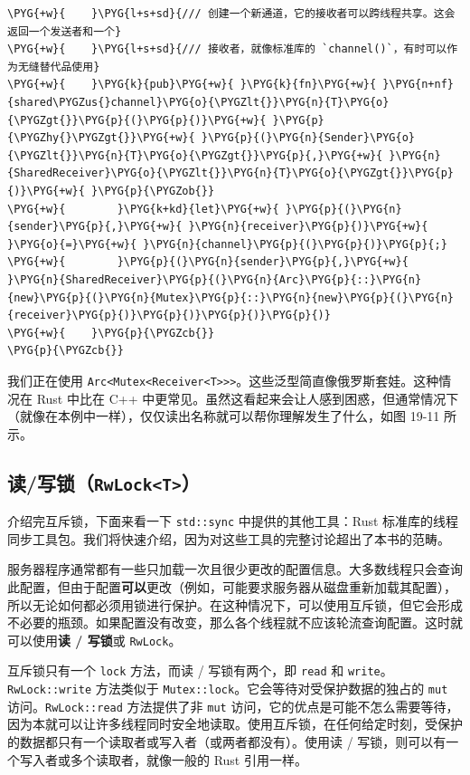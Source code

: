\begin{Verbatim}[commandchars=\\\{\},breaklines=true,breakanywhere=true,fontsize=\codefont,xleftmargin=17bp]
\PYG{+w}{    }\PYG{l+s+sd}{/// 创建一个新通道，它的接收者可以跨线程共享。这会返回一个发送者和一个}
\PYG{+w}{    }\PYG{l+s+sd}{/// 接收者，就像标准库的 `channel()`，有时可以作为无缝替代品使用}
\PYG{+w}{    }\PYG{k}{pub}\PYG{+w}{ }\PYG{k}{fn}\PYG{+w}{ }\PYG{n+nf}{shared\PYGZus{}channel}\PYG{o}{\PYGZlt{}}\PYG{n}{T}\PYG{o}{\PYGZgt{}}\PYG{p}{(}\PYG{p}{)}\PYG{+w}{ }\PYG{p}{\PYGZhy{}\PYGZgt{}}\PYG{+w}{ }\PYG{p}{(}\PYG{n}{Sender}\PYG{o}{\PYGZlt{}}\PYG{n}{T}\PYG{o}{\PYGZgt{}}\PYG{p}{,}\PYG{+w}{ }\PYG{n}{SharedReceiver}\PYG{o}{\PYGZlt{}}\PYG{n}{T}\PYG{o}{\PYGZgt{}}\PYG{p}{)}\PYG{+w}{ }\PYG{p}{\PYGZob{}}
\PYG{+w}{        }\PYG{k+kd}{let}\PYG{+w}{ }\PYG{p}{(}\PYG{n}{sender}\PYG{p}{,}\PYG{+w}{ }\PYG{n}{receiver}\PYG{p}{)}\PYG{+w}{ }\PYG{o}{=}\PYG{+w}{ }\PYG{n}{channel}\PYG{p}{(}\PYG{p}{)}\PYG{p}{;}
\PYG{+w}{        }\PYG{p}{(}\PYG{n}{sender}\PYG{p}{,}\PYG{+w}{ }\PYG{n}{SharedReceiver}\PYG{p}{(}\PYG{n}{Arc}\PYG{p}{::}\PYG{n}{new}\PYG{p}{(}\PYG{n}{Mutex}\PYG{p}{::}\PYG{n}{new}\PYG{p}{(}\PYG{n}{receiver}\PYG{p}{)}\PYG{p}{)}\PYG{p}{)}\PYG{p}{)}
\PYG{+w}{    }\PYG{p}{\PYGZcb{}}
\PYG{p}{\PYGZcb{}}
\end{Verbatim}

我们正在使用 \texttt{Arc<Mutex<Receiver<T>>>}。这些泛型简直像俄罗斯套娃。这种情况在 Rust 中比在 C++ 中更常见。虽然这看起来会让人感到困惑，但通常情况下（就像在本例中一样），仅仅读出名称就可以帮你理解发生了什么，如图 19-11 所示。


\subsection{读/写锁（\texttt{RwLock<T>}）}

介绍完互斥锁，下面来看一下 \texttt{std::sync} 中提供的其他工具：Rust 标准库的线程同步工具包。我们将快速介绍，因为对这些工具的完整讨论超出了本书的范畴。

服务器程序通常都有一些只加载一次且很少更改的配置信息。大多数线程只会查询此配置，但由于配置\textbf{可以}更改（例如，可能要求服务器从磁盘重新加载其配置），所以无论如何都必须用锁进行保护。在这种情况下，可以使用互斥锁，但它会形成不必要的瓶颈。如果配置没有改变，那么各个线程就不应该轮流查询配置。这时就可以使用\textbf{读 / 写锁}或 \texttt{RwLock}。

互斥锁只有一个 \texttt{lock} 方法，而读 / 写锁有两个，即 \texttt{read} 和 \texttt{write}。\texttt{RwLock::write} 方法类似于 \texttt{Mutex::lock}。它会等待对受保护数据的独占的 \texttt{mut} 访问。\texttt{RwLock::read} 方法提供了非 \texttt{mut} 访问，它的优点是可能不怎么需要等待，因为本就可以让许多线程同时安全地读取。使用互斥锁，在任何给定时刻，受保护的数据都只有一个读取者或写入者（或两者都没有）。使用读 / 写锁，则可以有一个写入者或多个读取者，就像一般的 Rust 引用一样。

